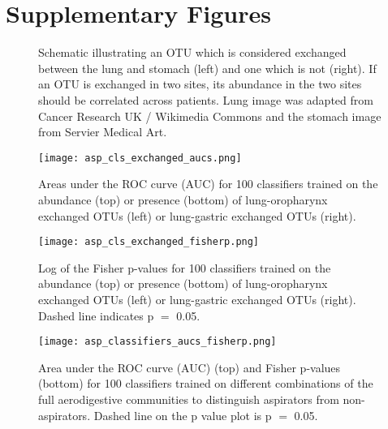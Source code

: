 \newpage
\FloatBarrier

\section{Supplementary Figures}

\begin{figure}[h]
        \begin{center}
        \caption{Schematic illustrating an OTU which is considered exchanged between the lung and stomach (left) and one which is not (right). If an OTU is exchanged in two sites, its abundance in the two sites should be correlated across patients. Lung image was adapted from Cancer Research UK / Wikimedia Commons and the stomach image from Servier Medical Art.}
        \label{fig:exchanged_schematic}
        \end{center}
\end{figure}


\begin{figure}[h]
        \begin{center}\texttt{[image: asp\_cls\_exchanged\_aucs.png]}
        \caption{Areas under the ROC curve (AUC) for 100 classifiers trained on the abundance (top) or presence (bottom) of lung-oropharynx exchanged OTUs (left) or lung-gastric exchanged OTUs (right).}
        \label{fig:exchanged_cls_aucs}
        \end{center}
\end{figure}

\begin{figure}[h]
        \begin{center}\texttt{[image: asp\_cls\_exchanged\_fisherp.png]}
        \caption{Log of the Fisher p-values for 100 classifiers trained on the abundance (top) or presence (bottom) of lung-oropharynx exchanged OTUs (left) or lung-gastric exchanged OTUs (right). Dashed line indicates p $=$ 0.05.}
        \label{fig:exchanged_cls_p}
        \end{center}
\end{figure}

\begin{figure}[h]
        \begin{center}\texttt{[image: asp\_classifiers\_aucs\_fisherp.png]}
        \caption{Area under the ROC curve (AUC) (top) and Fisher p-values (bottom) for 100 classifiers trained on different combinations of the full aerodigestive communities to distinguish aspirators from non-aspirators. Dashed line on the p value plot is p $=$ 0.05.}
        \label{fig:aucs_pvalues}
        \end{center}
\end{figure}
